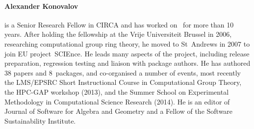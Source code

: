 \paragraph{Alexander Konovalov}

%

%



is a Senior Research Fellow in CIRCA and has worked on \GAP\ for more than 10 years. 
After holding the fellowship at the Vrije Universiteit
Brussel in 2006, researching computational group ring theory, he moved
to St~Andrews in 2007 to join EU project~SCIEnce. He leads many
aspects of the \GAP project, including release preparation, regression
testing and liaison with package authors. He has authored 38 papers
and 8~\GAP packages, and co-organised a number of events, most recently 
the LMS/EPSRC Short Instructional Course in Computational Group Theory,
the HPC-GAP workshop (2013), and
the Summer School on Experimental Methodology in Computational Science Research
(2014).
He is an editor of Journal of Software for Algebra and Geometry 
and a Fellow of the Software Sustainability Institute.